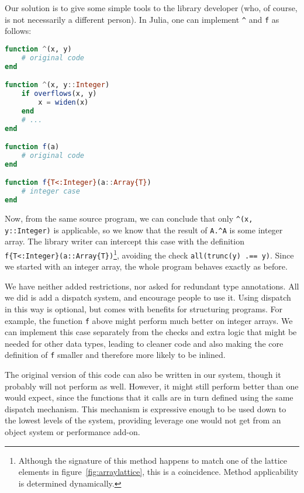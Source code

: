 Our solution is to give some simple tools to the library developer
(who, of course, is not necessarily a different person).
In Julia, one can implement \texttt{\^} and \texttt{f} as follows:

\begin{singlespace}
\begin{lstlisting}[language=julia]
function ^(x, y)
    # original code
end

function ^(x, y::Integer)
    if overflows(x, y)
        x = widen(x)
    end
    # ...
end

function f(a)
    # original code
end

function f{T<:Integer}(a::Array{T})
    # integer case
end
\end{lstlisting}
\end{singlespace}

\noindent
Now, from the same source program, we can conclude that only
\texttt{\^{}(x, y::Integer)} is applicable, so we know that the
result of \texttt{A.\^{}A} is some integer array.
The library writer can intercept this case with the definition
\texttt{f\{T<:Integer\}(a::Array\{T\})}\footnote{
Although the signature of this method happens to match one of the
lattice elements in figure~\ref{fig:arraylattice}, this is a coincidence.
Method applicability is determined dynamically.
}, avoiding the check \texttt{all(trunc(y) .== y)}.
Since we started with an integer array, the whole program behaves
exactly as before.

We have neither added restrictions, nor asked for redundant type annotations.
All we did is add a dispatch system, and encourage people to use it.
Using dispatch in this way is optional, but comes with benefits for
structuring programs.
For example, the function \texttt{f} above might perform much better
on integer arrays.
We can implement this case separately from the checks and extra logic
that might be needed for other data types, leading to cleaner code
and also making the core definition of \texttt{f} smaller and therefore
more likely to be inlined.


The original version of this code can also be written in our system,
though it probably will not perform as well.
However, it might still perform better than one would expect, since the
functions that it calls are in turn defined using the same dispatch
mechanism.
This mechanism is expressive enough to be used down to the lowest levels of
the system, providing leverage one would not get from an object system
or performance add-on.

